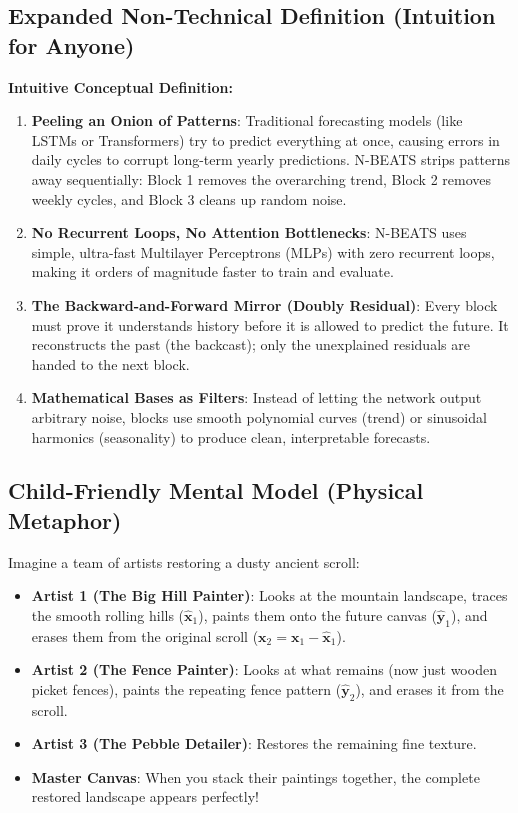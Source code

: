 \documentclass[11pt,a4paper]{article}
\theoremstyle{definition}
\begin{document}
\subsection{Expanded Non-Technical Definition (Intuition for Anyone)}
\textbf{Intuitive Conceptual Definition:}
\begin{enumerate}
    \item \textbf{Peeling an Onion of Patterns}: Traditional forecasting models (like LSTMs or Transformers) try to predict everything at once, causing errors in daily cycles to corrupt long-term yearly predictions. N-BEATS strips patterns away sequentially: Block 1 removes the overarching trend, Block 2 removes weekly cycles, and Block 3 cleans up random noise.
    \item \textbf{No Recurrent Loops, No Attention Bottlenecks}: N-BEATS uses simple, ultra-fast Multilayer Perceptrons (MLPs) with zero recurrent loops, making it orders of magnitude faster to train and evaluate.
    \item \textbf{The Backward-and-Forward Mirror (Doubly Residual)}: Every block must prove it understands history before it is allowed to predict the future. It reconstructs the past (the backcast); only the unexplained residuals are handed to the next block.
    \item \textbf{Mathematical Bases as Filters}: Instead of letting the network output arbitrary noise, blocks use smooth polynomial curves (trend) or sinusoidal harmonics (seasonality) to produce clean, interpretable forecasts.
\end{enumerate}

\subsection{Child-Friendly Mental Model (Physical Metaphor)}
Imagine a team of artists restoring a dusty ancient scroll:
\begin{itemize}
    \item \textbf{Artist 1 (The Big Hill Painter)}: Looks at the mountain landscape, traces the smooth rolling hills ($\widehat{\mathbf{x}}_1$), paints them onto the future canvas ($\widehat{\mathbf{y}}_1$), and erases them from the original scroll ($\mathbf{x}_2 = \mathbf{x}_1 - \widehat{\mathbf{x}}_1$).
    \item \textbf{Artist 2 (The Fence Painter)}: Looks at what remains (now just wooden picket fences), paints the repeating fence pattern ($\widehat{\mathbf{y}}_2$), and erases it from the scroll.
    \item \textbf{Artist 3 (The Pebble Detailer)}: Restores the remaining fine texture.
    \item \textbf{Master Canvas}: When you stack their paintings together, the complete restored landscape appears perfectly!
\end{itemize}
\end{document}
